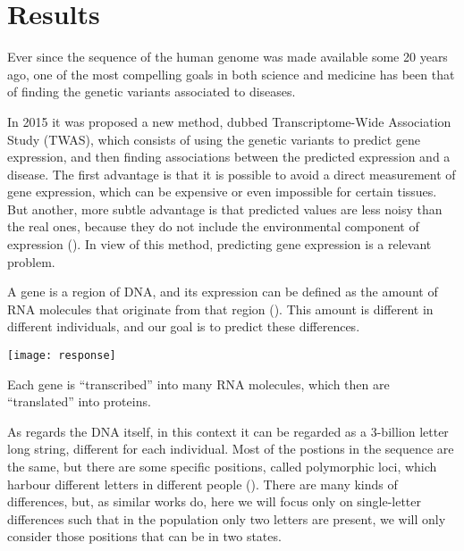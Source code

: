\documentclass[../main.tex]{subfiles}
\begin{document}
\section{Results}

Ever since the sequence of the human genome was made available some 20 
years ago,  one of the most 
compelling goals in both science and medicine has been that of finding 
the genetic variants associated to diseases.


In 2015 it was proposed a new method, 
 dubbed Transcriptome-Wide 
Association Study (TWAS), which consists of using the genetic variants 
to predict gene expression, and then finding associations between the 
predicted expression and a disease. The first advantage is that it is 
possible to avoid a direct measurement of gene expression, which can be 
expensive or even impossible for certain tissues. But another, more 
subtle advantage is that predicted values are less noisy than the real 
ones, because they do not include the environmental component of 
expression (). In view of this method, predicting gene 
expression is a relevant problem.

A gene is a region of DNA, and its expression can be defined as the 
amount of RNA molecules that originate from that region 
(). This amount is different in different individuals, 
and our goal is to predict these differences.

\begin{marginfigure}[-3.8cm]
  \texttt{[image: response]}
  \caption{Each gene is \enquote{transcribed} into many RNA molecules, 
which then are \enquote{translated} into proteins.}
\end{marginfigure}

As regards the DNA itself, in this context it can be regarded as a 
3-billion letter long string, different for each individual. Most of the 
postions in the sequence are the same, but there are some specific 
positions, called polymorphic loci, which harbour different letters in 
different people (). There are many kinds of 
differences, but, as similar works do, 
 here we will focus only on 
single-letter differences such that in the population only two letters 
are present, \ie we will only consider those positions that can be in 
two states.
\end{document}
